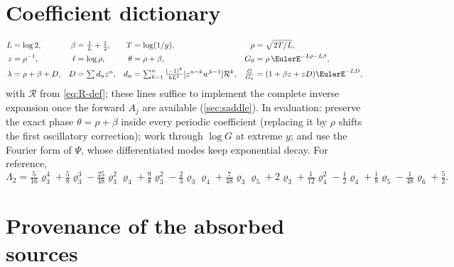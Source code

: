 \documentclass[11pt,oneside]{article}
\numberwithin{equation}{section}
\theoremstyle{definition}
\theoremstyle{remark}
\newcommand{\Gzero}{G_0}
\begin{document}
\section{Coefficient dictionary}
\label{app:dictionary}

\begin{align*}
 L&=\log2,
 &\beta&=\tfrac1L+\tfrac12,
 &T&=\log(1/y),
 &\rho&=\sqrt{2T/L},\\
 z&=\rho^{-1},
 &\ell&=\log\rho,
 &\theta&=\rho+\beta,
 &\Gzero&=\rho\,\EulerE^{-L\rho-L\beta},\\
 \lambda&=\rho+\beta+D,
 &D&=\textstyle\sum d_nz^{n},
 &d_n&=\textstyle\sum_{k=1}^{n}\frac{(-1)^{k}}{kL^{k}}
 [z^{n-k}w^{k-1}]\mathcal R^{k},
 &\tfrac G{\Gzero}&=(1+\beta z+zD)\EulerE^{-LD},
\end{align*}
with $\mathcal R$ from \eqref{eq:R-def}; these lines suffice to
implement the complete inverse expansion once the forward
$A_j$ are available (\cref{sec:saddle}).  In evaluation: preserve the
exact phase $\theta=\rho+\beta$ inside every periodic coefficient
(replacing it by $\rho$ shifts the first oscillatory correction);
work through $\log G$ at extreme $y$; and use the Fourier form of
$\Psi$, whose differentiated modes keep exponential decay.  For
reference,
\begin{equation}
 \Lambda_2=\tfrac5{16}\varrho_3^{4}+\tfrac58\varrho_3^{3}
 -\tfrac{25}{48}\varrho_3^{2}\varrho_4+\tfrac98\varrho_3^{2}
 -\tfrac23\varrho_3\varrho_4+\tfrac7{48}\varrho_3\varrho_5
 +2\varrho_3+\tfrac1{12}\varrho_4^{2}-\tfrac12\varrho_4
 +\tfrac18\varrho_5-\tfrac1{48}\varrho_6+\tfrac52.
 \label{eq:Lambda2-expanded}
\end{equation}

\section{Provenance of the absorbed sources}
\label{sec:provenance-inv}
\end{document}
